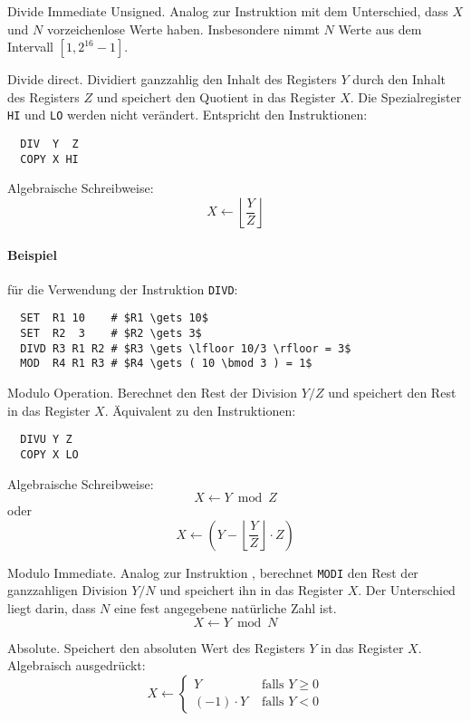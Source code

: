 \glqq Divide Immediate Unsigned\grqq.
Analog zur Instruktion  mit dem Unterschied, dass $X$ und $N$
vorzeichenlose Werte haben. Insbesondere nimmt $N$ Werte aus dem Intervall
$[1, 2^{16}-1]$.



\glqq Divide direct\grqq.
Dividiert ganzzahlig den Inhalt des Registers $Y$ durch den Inhalt des Registers
$Z$ und speichert den Quotient in das Register $X$. Die Spezialregister
\texttt{HI} und \texttt{LO} werden nicht verändert.
Entspricht den Instruktionen:
\begin{lstlisting}
  DIV  Y  Z
  COPY X HI
\end{lstlisting}
Algebraische Schreibweise:
\[
    X \gets \left\lfloor \frac{Y}{Z}  \right\rfloor
\]

\paragraph{Beispiel}
für die Verwendung der Instruktion \texttt{DIVD}:
\begin{lstlisting}
  SET  R1 10    # $R1 \gets 10$
  SET  R2  3    # $R2 \gets 3$
  DIVD R3 R1 R2 # $R3 \gets \lfloor 10/3 \rfloor = 3$
  MOD  R4 R1 R3 # $R4 \gets ( 10 \bmod 3 ) = 1$
\end{lstlisting}



Modulo Operation.
Berechnet den Rest der Division $Y/Z$ und speichert den Rest in das Register
$X$.
Äquivalent zu den Instruktionen:
\begin{lstlisting}
  DIVU Y Z
  COPY X LO
\end{lstlisting}

Algebraische Schreibweise:
\[
    X \gets Y \bmod Z
\]
oder
\[
    X \gets \left(
      Y - \left\lfloor \frac{Y}{Z}  \right\rfloor \cdot Z
      \right)
\]


\glqq Modulo Immediate\grqq. Analog zur Instruktion , berechnet
\texttt{MODI} den Rest der ganzzahligen Division $Y / N$ und speichert ihn in
das Register $X$. Der Unterschied liegt darin, dass $N$ eine fest angegebene
natürliche Zahl ist.
\[
    X \gets Y \bmod N
\]


\glqq Absolute\grqq.
Speichert den absoluten Wert des Registers $Y$ in das Register $X$.
Algebraisch ausgedrückt:
\[
    X \gets
    \begin{cases}
      Y            & \text{ falls } Y \geq 0 \\
      (-1) \cdot Y & \text{ falls } Y < 0
    \end{cases}
\]



